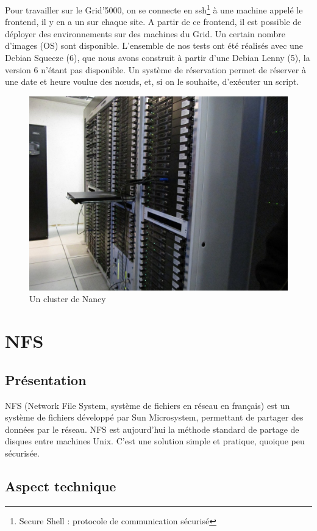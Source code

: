 \documentclass[12pt]{report}
\begin{document}
		Pour travailler sur le Grid'5000, on se connecte en ssh\footnote{Secure Shell : protocole de communication sécurisé} à une machine appelé le \og frontend\fg, il y en a un sur chaque site.
		A partir de ce frontend, il est possible de déployer des environnements sur des machines du Grid.
		Un certain nombre d'images (OS) sont disponible. L'ensemble de nos tests ont été réalisés avec une Debian Squeeze (6),
		que nous avons construit à partir d'une Debian Lenny (5), la version 6 n'étant pas disponible.
		Un système de réservation permet de réserver à une date et heure voulue des nœuds, et, si on le souhaite,
		d'exécuter un script.

		\begin{figure}[H]
			\begin{center}
				\includegraphics[width=0.6\linewidth]{images/cluster_nancy.jpg}
				\caption{Un cluster de Nancy}
			\end{center}
		\end{figure}
		


	\chapter{NFS}
		\section{Présentation}

NFS (Network File System, système de fichiers en réseau en français) est un système de fichiers développé par Sun Microsystem, permettant de partager des données par le réseau. NFS est aujourd’hui la méthode standard de partage de disques entre machines Unix. 
		C’est une solution simple et pratique, quoique peu sécurisée.\\
		
		\section{Aspect technique}
		
\end{document}

